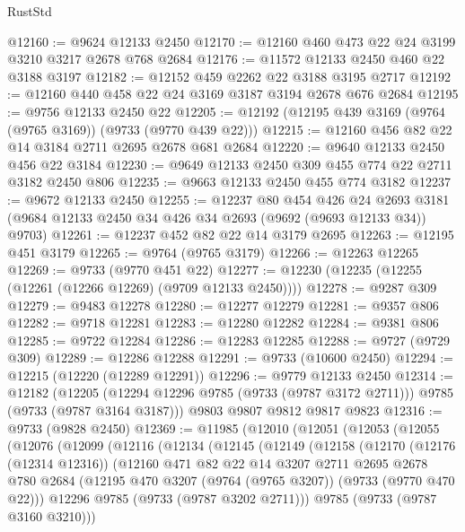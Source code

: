 \begin{lexlean}{RustStd}
\begin{coremodule}
{\begin{coremodule}
{{{{{{{{{{{{{{{{{{{{{{{{{{{{{{{{{{{{{{{{{{{{{{{{{{{{{{{@12160 := @9624 @12133 @2450
@12170 := @12160 @460 @473 @22 @24 @3199 @3210 @3217 @2678 @768 @2684
@12176 := @11572 @12133 @2450 @460 @22 @3188 @3197
@12182 := @12152 @459 @2262 @22 @3188 @3195 @2717
@12192 := @12160 @440 @458 @22 @24 @3169 @3187 @3194 @2678 @676 @2684
@12195 := @9756 @12133 @2450 @22
@12205 := @12192 (@12195 @439 @3169 (@9764 (@9765 @3169)) (@9733 (@9770 @439 @22)))
@12215 := @12160 @456 @82 @22 @14 @3184 @2711 @2695 @2678 @681 @2684
@12220 := @9640 @12133 @2450 @456 @22 @3184
@12230 := @9649 @12133 @2450 @309 @455 @774 @22 @2711 @3182 @2450 @806
@12235 := @9663 @12133 @2450 @455 @774 @3182
@12237 := @9672 @12133 @2450
@12255 := @12237
    @80
    @454
    @426
    @24
    @2693
    @3181
    (@9684 @12133 @2450 @34 @426 @34 @2693 (@9692 (@9693 @12133 @34)) @9703)
@12261 := @12237 @452 @82 @22 @14 @3179 @2695
@12263 := @12195 @451 @3179
@12265 := @9764 (@9765 @3179)
@12266 := @12263 @12265
@12269 := @9733 (@9770 @451 @22)
@12277 := @12230 (@12235 (@12255 (@12261 (@12266 @12269) (@9709 @12133 @2450))))
@12278 := @9287 @309
@12279 := @9483 @12278
@12280 := @12277 @12279
@12281 := @9357 @806
@12282 := @9718 @12281
@12283 := @12280 @12282
@12284 := @9381 @806
@12285 := @9722 @12284
@12286 := @12283 @12285
@12288 := @9727 (@9729 @309)
@12289 := @12286 @12288
@12291 := @9733 (@10600 @2450)
@12294 := @12215 (@12220 (@12289 @12291))
@12296 := @9779 @12133 @2450
@12314 := @12182
    (@12205 (@12294 @12296 @9785 (@9733 (@9787 @3172 @2711))) @9785 (@9733 (@9787 @3164 @3187)))
    @9803
    @9807
    @9812
    @9817
    @9823
@12316 := @9733 (@9828 @2450)
@12369 := @11985
    (@12010
      (@12051
        (@12053
          (@12055
            (@12076
              (@12099
                (@12116
                  (@12134
                    (@12145
                      (@12149
                        (@12158
                          (@12170
                            (@12176 (@12314 @12316))
                            (@12160
                              @471
                              @82
                              @22
                              @14
                              @3207
                              @2711
                              @2695
                              @2678
                              @780
                              @2684
                              (@12195 @470 @3207 (@9764 (@9765 @3207)) (@9733 (@9770 @470 @22)))
                              @12296
                              @9785
                              (@9733 (@9787 @3202 @2711)))
                            @9785
                            (@9733 (@9787 @3160 @3210)))
}}}}}}}}}}}}}}}}}}}}}}}}}}}}}}}}}}}}}}}}}}}}}}}}}}}}}}}
\end{coremodule}}
\end{coremodule}
\end{lexlean}
